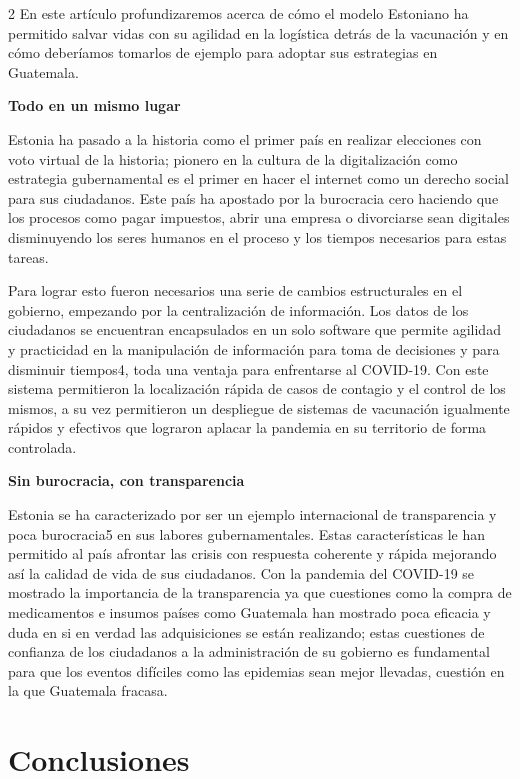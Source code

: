 \documentclass[12pt,spanish,Letterpaper,openany]{book}
\newcommand{\spacethreemilis}{\vspace{3mm}}
\begin{document}
\begin {multicols}{2}
En este artículo profundizaremos acerca de cómo el modelo Estoniano ha permitido salvar vidas
con su agilidad en la logística detrás de la vacunación y en cómo deberíamos tomarlos de
ejemplo para adoptar sus estrategias en Guatemala.

\spacethreemilis
\spacethreemilis

\textbf{Todo en un mismo lugar}

Estonia ha pasado a la historia como el primer país en realizar elecciones con voto virtual de la
historia; pionero en la cultura de la digitalización como estrategia gubernamental es el primer en
hacer el internet como un derecho social para sus ciudadanos. Este país ha apostado por la
burocracia cero haciendo que los procesos como pagar impuestos, abrir una empresa o
divorciarse sean digitales disminuyendo los seres humanos en el proceso y los tiempos
necesarios para estas tareas.

Para lograr esto fueron necesarios una serie de cambios estructurales en el gobierno, empezando
por la centralización de información. Los datos de los ciudadanos se encuentran encapsulados en
un solo software que permite agilidad y practicidad en la manipulación de información para toma
de decisiones y para disminuir tiempos4, toda una ventaja para enfrentarse al COVID-19. Con
este sistema permitieron la localización rápida de casos de contagio y el control de los mismos, a
su vez permitieron un despliegue de sistemas de vacunación igualmente rápidos y efectivos que
lograron aplacar la pandemia en su territorio de forma controlada.

\spacethreemilis

\textbf{Sin burocracia, con transparencia}

Estonia se ha caracterizado por ser un ejemplo internacional de transparencia y poca burocracia5
en sus labores gubernamentales. Estas características le han permitido al país afrontar las crisis
con respuesta coherente y rápida mejorando así la calidad de vida de sus ciudadanos. Con la
pandemia del COVID-19 se mostrado la importancia de la transparencia ya que cuestiones como
la compra de medicamentos e insumos países como Guatemala han mostrado poca eficacia y
duda en si en verdad las adquisiciones se están realizando; estas cuestiones de confianza de los
ciudadanos a la administración de su gobierno es fundamental para que los eventos difíciles
como las epidemias sean mejor llevadas, cuestión en la que Guatemala fracasa.

\hypertarget{conclusiones-6}{%
\section{Conclusiones}\label{conclusiones-6}}


\end{multicols}
\end{document}
